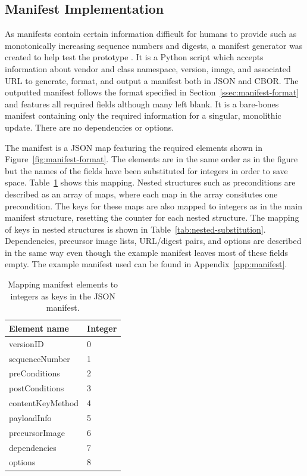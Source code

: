 \documentclass[0-thesis.tex]{subfiles}
\begin{document}
\subsection{Manifest Implementation}
\label{ssec:manifest-implementation}
As manifests contain certain information difficult for humans to provide such as
monotonically increasing sequence numbers and digests, a manifest generator was created to
help test the prototype \parencite{manifest-generator}. It is a Python script which
accepts information about vendor and class namespace, version, image, and associated URL
to generate, format, and output a manifest both in JSON and CBOR. The outputted manifest
follows the format specified in Section~\ref{ssec:manifest-format} and features all
required fields although many left blank. It is a bare-bones manifest containing only the
required information for a singular, monolithic update. There are no dependencies or
options. 

The manifest is a JSON map featuring the required elements shown in
Figure~\ref{fig:manifest-format}. The elements are in the same order as in the figure but
the names of the fields have been substituted for integers in order to save space.
Table~\ref{tab:manifest-substitution} shows this mapping. Nested structures such as
preconditions are described as an array of maps, where each map in the array consitutes
one precondition. The keys for these maps are also mapped to integers as in the main
manifest structure, resetting the counter for each nested structure. The mapping of keys
in nested structures is shown in Table~\ref{tab:nested-substitution}. Dependencies,
precursor image lists, URL/digest pairs, and options are described in the same way even
though the example manifest leaves most of these fields empty. The example manifest used
can be found in Appendix~\ref{app:manifest}. 

\begin{longtable}[]{@{}ll@{}}
    \caption{Mapping manifest elements to integers as keys in the JSON manifest.}
    \label{tab:manifest-substitution}\\
    \toprule
    Element name & Integer\tabularnewline
    \midrule
    \endhead
    versionID & 0\tabularnewline
    sequenceNumber & 1\tabularnewline
    preConditions & 2\tabularnewline
    postConditions & 3\tabularnewline
    contentKeyMethod & 4\tabularnewline
    payloadInfo & 5\tabularnewline
    precursorImage & 6\tabularnewline
    dependencies & 7\tabularnewline
    options & 8\tabularnewline
    \bottomrule
\end{longtable}
\end{document}
